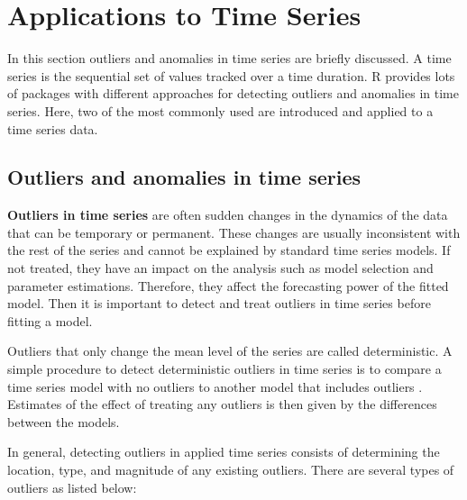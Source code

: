 \section{Applications to Time Series} \label{Section:5}
In this section outliers and anomalies in time series are briefly discussed. A time series is the sequential set of values tracked over a time duration. R provides lots of packages with different approaches for detecting outliers and anomalies in time series. Here, two of the most commonly used are introduced and applied to a time series data. \subsection{Outliers and anomalies in time series} \textbf{Outliers in time series} are often sudden changes in the dynamics of the data that can be temporary or permanent. These changes are usually inconsistent with the rest of the series and cannot be explained by standard time series models. If not treated, they have an impact on the analysis such as model selection and parameter estimations. Therefore, they affect the forecasting power of the fitted model. Then it is important to detect and treat outliers in time series before fitting a model. \par Outliers that only change the mean level of the series are called deterministic. A simple procedure to detect deterministic outliers in time series is to compare a time series model with no outliers to another model that includes outliers \cite{tsay}. Estimates of the effect of treating any outliers is then given by the differences between the models. \par In general, detecting outliers in applied time series consists of determining the location, type, and magnitude of any existing outliers. There are several types of outliers as listed below: 
